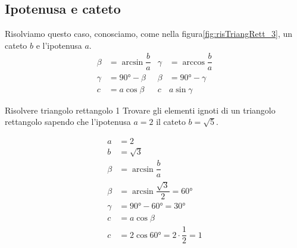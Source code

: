 \subsection{Ipotenusa e cateto}
Risolviamo questo caso, conosciamo, come nella figura\nobs\vref{fig:risTriangRett_3}, un cateto $b$ e l'ipotenusa $a$.
\begin{align*}
\beta&=\arcsin\dfrac{b}{a}&\gamma&=\arccos\dfrac{b}{a}\\
\gamma&=\ang{90}-\beta&\beta&=\ang{90}-\gamma\\
c&=a\cos\beta&c&a\sin\gamma
\end{align*}
\begin{esempiot}{Risolvere triangolo rettangolo 1}{}
Trovare gli elementi ignoti di un triangolo rettangolo sapendo che l'ipotenusa $a=2$  il cateto $b=\sqrt{5}$.
\end{esempiot}
\begin{align*}
a&=\num{2}\\
b&=\sqrt{\num{3}}\\
\beta&=\arcsin\dfrac{b}{a}\\
\beta&=\arcsin\dfrac{\sqrt{3}}{2}=\ang{60}\\
\gamma&=\ang{90}-\ang{60}=\ang{30}\\
c&=a\cos\beta\\
c&=2\cos\ang{60}=2\cdot\dfrac{1}{2}=1
\end{align*} 
